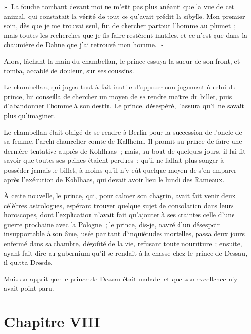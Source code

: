 \documentclass[french,twoside]{book} %
\newcommand\chapteropen{} %
\newcommand\chapterclose{} %
\begin{document}
» La foudre tombant devant moi ne m’eût pas plus anéanti que la vue de cet animal, qui constatait la vérité de tout ce qu’avait prédit la sibylle. Mon premier soin, dès que je me trouvai seul, fut de chercher partout l’homme au plumet ; mais toutes les recherches que je fis faire restèrent inutiles, et ce n’est que dans la chaumière de Dahne que j’ai retrouvé mon homme. »\par
Alors, lâchant la main du chambellan, le prince essuya la sueur de son front, et tomba, accablé de douleur, sur ses coussins.\par
Le chambellan, qui jugea tout-à-fait inutile d’opposer son jugement à celui du prince, lui conseilla de chercher un moyen de se rendre maître du billet, puis d’abandonner l’homme à son destin. Le prince, désespéré, l’assura qu’il ne savait plus qu’imaginer.\par
Le chambellan était obligé de se rendre à Berlin pour la succession de l’oncle de sa femme, l’archi-chancelier comte de Kallheim. Il promit au prince de faire une dernière tentative auprès de Kohlhaas ; mais, au bout de quelques jours, il lui fit savoir que toutes ses peines étaient perdues ; qu’il ne fallait plus songer à posséder jamais le billet, à moins qu’il n’y eût quelque moyen de s’en emparer après l’exécution de Kohlhaas, qui devait avoir lieu le lundi des Rameaux.\par
À cette nouvelle, le prince, qui, pour calmer son chagrin, avait fait venir deux célèbres astrologues, espérant trouver quelque sujet de consolation dans leurs horoscopes, dont l’explication n’avait fait qu’ajouter à ses craintes celle d’une guerre prochaine avec la Pologne ; le prince, dis-je, navré d’un désespoir insupportable à son âme, usée par tant d’inquiétudes mortelles, passa deux jours enfermé dans sa chambre, dégoûté de la vie, refusant toute nourriture ; ensuite, ayant fait dire au gubernium qu’il se rendait à la chasse chez le prince de Dessau, il quitta Dresde.\par
Mais on apprit que le prince de Dessau était malade, et que son excellence n’y avait point paru.
\chapterclose


\chapteropen
\chapter[{Chapitre VIII}]{Chapitre VIII}\renewcommand{\leftmark}{Chapitre VIII}
\end{document}
